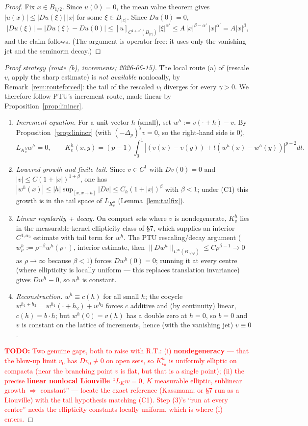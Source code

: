 \documentclass[11pt]{amsart}
\theoremstyle{plain}
\theoremstyle{definition}
\theoremstyle{remark}
\newcommand{\fpl}[1]{(-\Delta_p)^{s}#1}            %
\newcommand{\al}{\alpha}
\newcommand{\TODO}[1]{\textcolor{red}{\textbf{TODO:} #1}}
\begin{document}
\begin{proof}
Fix $x\in B_{1/2}$. Since $u(0)=0$, the mean value theorem gives
$|u(x)|\le|Du(\xi)|\,|x|$ for some $\xi\in B_{|x|}$. Since $Du(0)=0$,
\[
  |Du(\xi)| = |Du(\xi)-Du(0)|
  \le [u]_{C^{1+\al'}(B_{|x|})}\,|\xi|^{\al'}
  \le A\,|x|^{\beta-\al'}\,|x|^{\al'} = A|x|^{\beta},
\]
and the claim follows. (The argument is operator-free: it uses only the
vanishing jet and the seminorm decay.)
\end{proof}
\begin{proof}[Proof strategy (route (b), increments; 2026-06-15)]
The local route (a) of \cite{CP} (rescale $v$, apply the sharp estimate)
is \emph{not available} nonlocally, by Remark~\ref{rem:routeforced}: the
tail of the rescaled $v_l$ diverges for every $\gamma>0$. We therefore
follow PTU's increment route, made linear by
Proposition~\ref{prop:linincr}.
\begin{enumerate}
\item \emph{Increment equation.} For a unit vector $h$ (small), set
  $w^h:=v(\cdot+h)-v$. By Proposition~\ref{prop:linincr} (with $\fpl{v}=0$,
  so the right-hand side is $0$),
  \[
    L_{K_v^h}w^h=0,\qquad
    K_v^h(x,y)=(p-1)\!\int_0^1|(v(x){-}v(y))+t(w^h(x){-}w^h(y))|^{p-2}dt .
  \]
\item \emph{Lowered growth and finite tail.} Since $v\in C^1$ with
  $Dv(0)=0$ and $|v|\le C(1+|x|)^{1+\beta}$, one has
  $|w^h(x)|\le|h|\sup_{[x,x+h]}|Dv|\le C_h(1+|x|)^{\beta}$ with $\beta<1$;
  under (C1) this growth is in the tail space of $L_{K_v^h}$
  (Lemma~\ref{lem:tailfix}).
\item \emph{Linear regularity + decay.} On compact sets where $v$ is
  nondegenerate, $K_v^h$ lies in the measurable-kernel ellipticity class of
  \cite{GJS} \S7, which supplies an interior $C^{1,\al_0}$ estimate with
  tail term for $w^h$. The PTU rescaling/decay argument
  ($w^h_\rho:=\rho^{-\beta}w^h(\rho\cdot)$, interior estimate, then
  $\|Dw^h\|_{L^\infty(B_{1/2\rho})}\le C\rho^{\beta-1}\to0$ as $\rho\to\infty$
  because $\beta<1$) forces $Dw^h(0)=0$; running it at every centre (where
  ellipticity is locally uniform --- this replaces translation invariance)
  gives $Dw^h\equiv0$, so $w^h$ is constant.
\item \emph{Reconstruction.} $w^h\equiv c(h)$ for all small $h$; the cocycle
  $w^{h_1+h_2}=w^{h_1}(\cdot+h_2)+w^{h_2}$ forces $c$ additive and (by
  continuity) linear, $c(h)=b\cdot h$; but $w^h(0)=v(h)$ has a double zero
  at $h=0$, so $b=0$ and $v$ is constant on the lattice of increments,
  hence (with the vanishing jet) $v\equiv0$.
\end{enumerate}
\TODO{Two genuine gaps, both to raise with R.T.: (i) \textbf{nondegeneracy}
--- that the blow-up limit $v_0$ has $Dv_0\not\equiv0$ on open sets, so
$K_{v_0}^h$ is uniformly elliptic on compacta (near the branching point $v$
is flat, but that is a single point); (ii) the precise \textbf{linear
nonlocal Liouville} ``$L_K w=0$, $K$ measurable elliptic, sublinear growth
$\Rightarrow$ constant'' --- locate the exact reference (Kassmann; or
\cite{GJS} \S7 run as a Liouville) with the tail hypothesis matching (C1).
Step (3)'s ``run at every centre'' needs the ellipticity constants locally
uniform, which is where (i) enters.}
\end{proof}
\end{document}
